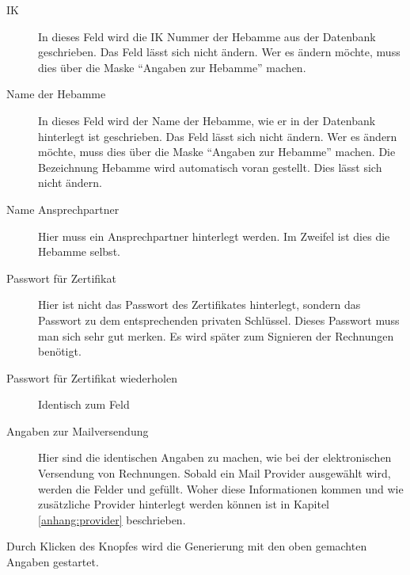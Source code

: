 \begin{description}
\item[IK]
In dieses Feld wird die IK Nummer der Hebamme aus der \tinyHeb\/ 
Datenbank geschrieben. Das Feld lässt sich nicht ändern. Wer es ändern
möchte, muss dies über die Maske ``Angaben zur Hebamme'' machen.
\item[Name der Hebamme]
In dieses Feld wird der Name der Hebamme, wie er in der \tinyHeb\/
Datenbank hinterlegt ist geschrieben. Das Feld lässt sich nicht ändern. 
Wer es ändern möchte, muss dies über die Maske ``Angaben zur Hebamme'' machen.
Die Bezeichnung Hebamme wird automatisch voran gestellt. Dies lässt sich
nicht ändern.
\item[Name Ansprechpartner]
Hier muss ein Ansprechpartner hinterlegt werden. Im Zweifel ist dies die
Hebamme selbst.
\item[Passwort für Zertifikat]
Hier ist nicht das Passwort des Zertifikates hinterlegt, sondern
das Passwort zu dem entsprechenden privaten Schlüssel. Dieses Passwort
muss man sich sehr gut merken. Es wird später zum Signieren der Rechnungen
benötigt.
\marginline{\Huge\bfseries!}%
\item[Passwort für Zertifikat wiederholen]
Identisch zum Feld 
\item[Angaben zur Mailversendung]
Hier sind die identischen Angaben zu machen, wie bei der elektronischen
Versendung von Rechnungen. Sobald ein Mail Provider ausgewählt wird, 
werden die Felder  und  gefüllt. 
Woher diese
Informationen kommen und wie zusätzliche Provider hinterlegt werden
können ist in Kapitel \vref{anhang:provider} beschrieben.
\end{description}

Durch Klicken des Knopfes  wird die Generierung
mit den oben gemachten Angaben gestartet.


